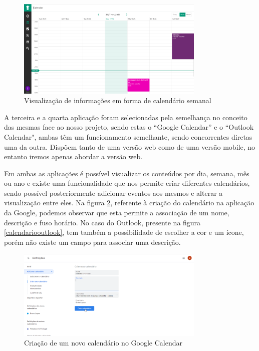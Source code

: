 \documentclass[11pt, twoside]{report}
\begin{document}
\begin{figure}[H] 
	\centering 
	\includegraphics[width=0.8\textwidth,height=0.8\textheight,keepaspectratio]{image/estadodearte/calendariostudy}
	\caption{Visualização de informações em forma de calendário semanal}
	\label{calendariostudylife}
\end{figure}

	A terceira e a quarta aplicação foram selecionadas pela semelhança no conceito das mesmas face ao nosso projeto, sendo estas o ``Google Calendar'' e o ``Outlook Calendar", ambas têm um funcionamento semelhante, sendo concorrentes diretas uma da outra. Dispõem tanto de uma versão web como de uma versão mobile, no entanto iremos apenas abordar a versão web.

	Em ambas as aplicações é possível visualizar os conteúdos por dia, semana, mês ou ano e existe uma funcionalidade que nos permite criar diferentes calendários, sendo possível posteriormente adicionar eventos aos mesmos e alterar a visualização entre eles. Na figura \ref{googlecalendar}, referente à criação do calendário na aplicação da Google, podemos observar que esta permite a associação de um nome, descrição e fuso horário. No caso do Outlook, presente na figura \ref{calendariooutlook}, tem também a possibilidade de escolher a cor e um ícone, porém não existe um campo para associar uma descrição.

	\begin{figure}[H] 
		\centering
		\includegraphics[width=0.8\textwidth,height=0.8\textheight,keepaspectratio]{image/estadodearte/criacao_calendario_google}
		\caption{Criação de um novo calendário no Google Calendar}
		\label{googlecalendar}
	\end{figure}
\end{document}
